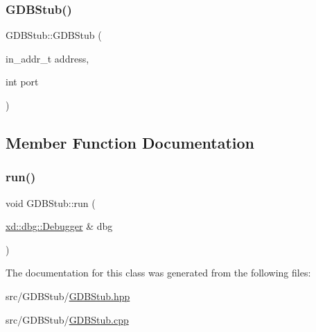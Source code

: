 \mbox{\label{classxd_1_1dbg_1_1gdbstub_1_1_g_d_b_stub_a999c20469b615a390dca0385bf9b5664}} 
\subsubsection{\texorpdfstring{G\+D\+B\+Stub()}{GDBStub()}\hspace{0.1cm}{\footnotesize\ttfamily [2/2]}}
{\footnotesize\ttfamily G\+D\+B\+Stub\+::\+G\+D\+B\+Stub (\begin{DoxyParamCaption}\item[{in\+\_\+addr\+\_\+t}]{address,  }\item[{int}]{port }\end{DoxyParamCaption})}



\subsection{Member Function Documentation}
\mbox{\label{classxd_1_1dbg_1_1gdbstub_1_1_g_d_b_stub_a43439a2c842fb6e696f87851c09afcd8}} 
\subsubsection{\texorpdfstring{run()}{run()}}
{\footnotesize\ttfamily void G\+D\+B\+Stub\+::run (\begin{DoxyParamCaption}\item[{\mbox{\hyperlink{classxd_1_1dbg_1_1_debugger}{xd\+::dbg\+::\+Debugger}} \&}]{dbg }\end{DoxyParamCaption})}



The documentation for this class was generated from the following files\+:\begin{DoxyCompactItemize}
\item 
src/\+G\+D\+B\+Stub/\mbox{\hyperlink{_g_d_b_stub_8hpp}{G\+D\+B\+Stub.\+hpp}}\item 
src/\+G\+D\+B\+Stub/\mbox{\hyperlink{_g_d_b_stub_8cpp}{G\+D\+B\+Stub.\+cpp}}\end{DoxyCompactItemize}
